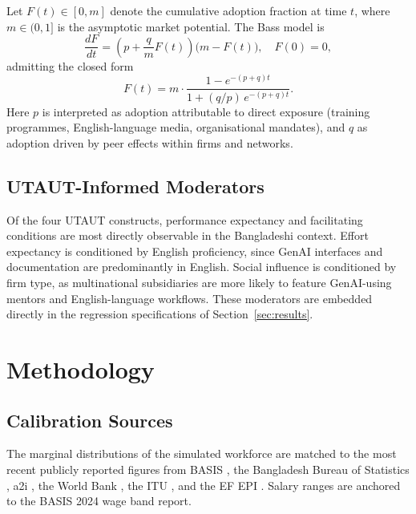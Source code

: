 \documentclass[11pt,a4paper]{article}
\begin{document}
Let $F(t)\in[0,m]$ denote the cumulative adoption fraction at time
$t$, where $m\in(0,1]$ is the asymptotic market potential. The Bass
model is
\begin{equation}
  \frac{dF}{dt} = \left(p + \frac{q}{m}F(t)\right)\bigl(m - F(t)\bigr),
  \quad F(0)=0,
  \label{eq:bass}
\end{equation}
admitting the closed form
\begin{equation}
  F(t) = m \cdot \frac{1 - e^{-(p+q)t}}{1 + (q/p)\,e^{-(p+q)t}}.
  \label{eq:bass-closed}
\end{equation}
Here $p$ is interpreted as adoption attributable to direct exposure
(training programmes, English-language media, organisational
mandates), and $q$ as adoption driven by peer effects within firms
and networks.

\subsection{UTAUT-Informed Moderators}

Of the four UTAUT constructs, performance expectancy and facilitating
conditions are most directly observable in the Bangladeshi context.
Effort expectancy is conditioned by English proficiency, since GenAI
interfaces and documentation are predominantly in English. Social
influence is conditioned by firm type, as multinational subsidiaries
are more likely to feature GenAI-using mentors and English-language
workflows. These moderators are embedded directly in the regression
specifications of Section~\ref{sec:results}.

\section{Methodology}

\subsection{Calibration Sources}

The marginal distributions of the simulated workforce are matched to
the most recent publicly reported figures from BASIS
\citep{BASIS2024,BASIS2025}, the Bangladesh Bureau of Statistics
\citep{BBS2024LFS}, a2i \citep{a2iDigitalLiteracy2024}, the World
Bank \citep{WorldBank2024DigitalBD}, the ITU
\citep{ITUDigitalDevelopment2025}, and the EF EPI \citep{EFEPI2024}.
Salary ranges are anchored to the BASIS 2024 wage band report.
\end{document}
